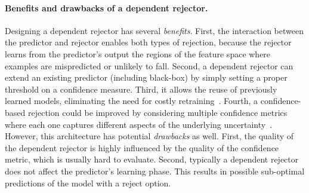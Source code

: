 \paragraph{\bf{Benefits and drawbacks of a dependent rejector.}} Designing a dependent rejector has several \emph{benefits}.
First, the interaction between the predictor and rejector enables both types of rejection, because the rejector learns from the predictor's output the regions of the feature space where examples are mispredicted or unlikely to fall.
Second, a dependent rejector can extend an existing predictor (including black-box) by simply setting a proper threshold on a confidence measure. Third, it allows the reuse of previously learned models, eliminating the need for costly retraining~\citep{Zou2011,Tang2014}. Fourth, a confidence-based rejection could be improved by considering multiple confidence metrics where each one captures different aspects of the underlying uncertainty~\citep{Tax2008}. However, this architecture has potential \emph{drawbacks} as well. First, the quality of the dependent rejector is highly influenced by the quality of the confidence metric, which is usually hard to evaluate. Second, typically a dependent rejector does not affect the predictor's learning phase. This results in possible sub-optimal predictions of the model with a reject option.

